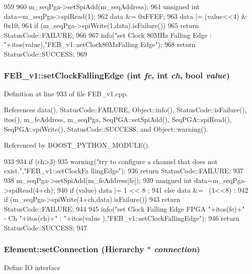 \begin{DoxyCode}
959                                                      {
960   m_seqPga->setSpiAdd(m_seqAddress);
961   unsigned int data=m_seqPga->spiRead(1);
962   data &= 0xFFEF;
963   data |= (value<<4) & 0x10;
964   if (m_seqPga->spiWrite(1,data).isFailure()){
965     return StatusCode::FAILURE;
966   }
967   info("set Clock 80MHz Falling Edge : "+itos(value),"FEB_v1::setClock80MzFalling
      Edge");
968   return StatusCode::SUCCESS;
969 }
\end{DoxyCode}
\hypertarget{classFEB__v1_af2bb7bacef6c06d15e2c9e47c373de08}{
\subsubsection[{setClockFallingEdge}]{ FEB\_\-v1::setClockFallingEdge (int {\em fe}, \/  int {\em ch}, \/  bool {\em value})}}
\label{classFEB__v1_af2bb7bacef6c06d15e2c9e47c373de08}


Definition at line 933 of file FEB\_\-v1.cpp.

References data(), StatusCode::FAILURE, Object::info(), StatusCode::isFailure(), itos(), m\_\-feAddress, m\_\-seqPga, SeqPGA::setSpiAdd(), SeqPGA::spiRead(), SeqPGA::spiWrite(), StatusCode::SUCCESS, and Object::warning().

Referenced by BOOST\_\-PYTHON\_\-MODULE().


\begin{DoxyCode}
933                                                                   {
934   if (ch>3){
935     warning("try to configure a channel that does not exist.","FEB_v1::setClockFa
      llingEdge");
936     return StatusCode::FAILURE;
937   }
938   m_seqPga->setSpiAdd(m_feAddress[fe]);
939   unsigned int data=m_seqPga->spiRead(4+ch);
940   if (value)  data |= 1 << 8  ;
941   else        data &= ~(1<<8) ;
942   if (m_seqPga->spiWrite(4+ch,data).isFailure()){
943     return StatusCode::FAILURE;
944   }
945   info("set Clock Falling Edge FPGA "+itos(fe)+" - Ch "+itos(ch)+" : "+itos(value
      ),"FEB_v1::setClockFallingEdge");
946   return StatusCode::SUCCESS;
947 }
\end{DoxyCode}
\hypertarget{classElement_ab476b4b1df5954141ceb14f072433b89}{
\subsubsection[{setConnection}]{ Element::setConnection ({\bf Hierarchy} $\ast$ {\em connection})}}
\label{classElement_ab476b4b1df5954141ceb14f072433b89}
Define IO interface 

